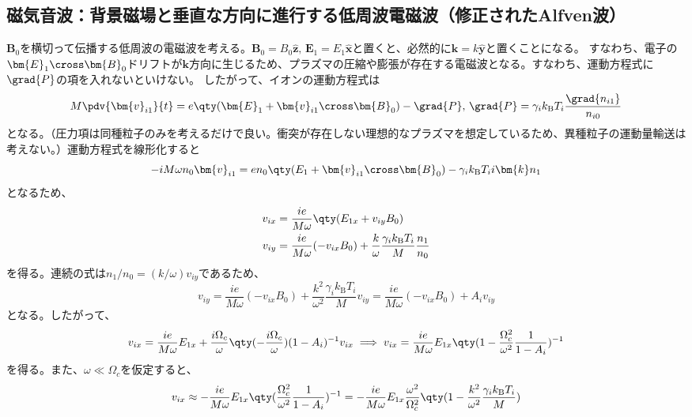 \subsection{磁気音波：背景磁場と垂直な方向に進行する低周波電磁波（修正されたAlfven波）}
$\bm{B}_0$を横切って伝播する低周波の電磁波を考える。$\bm{B}_0 = B_0\hat{\bm{z}},\,\bm{E}_1 = E_1\hat{\bm{x}}$と置くと、必然的に$\bm{k} = k\hat{\bm{y}}$と置くことになる。
すなわち、電子の$\bm{E}_1\cross\bm{B}_0$ドリフトが$\bm{k}$方向に生じるため、プラズマの圧縮や膨張が存在する電磁波となる。すなわち、運動方程式に$\grad{P}$の項を入れないといけない。
したがって、イオンの運動方程式は
\begin{equation}
	M\pdv{\bm{v}_{i1}}{t} = e\qty(\bm{E}_1 + \bm{v}_{i1}\cross\bm{B}_0) - \grad{P},\,
	\grad{P} = \gamma_ik_{\text{B}}T_i\frac{\grad{n_{i1}}}{n_{i0}}
\end{equation}
となる。（圧力項は同種粒子のみを考えるだけで良い。衝突が存在しない理想的なプラズマを想定しているため、異種粒子の運動量輸送は考えない。）運動方程式を線形化すると
\begin{equation}
	-iM\omega{}n_0\bm{v}_{i1} = en_0\qty(E_{1}+\bm{v}_{i1}\cross\bm{B}_0)-\gamma_i{}k_{\text{B}}T_ii\bm{k}n_{1}
\end{equation}
となるため、
\begin{align}
	v_{ix} & = \frac{ie}{M\omega}\qty(E_{1x} + v_{iy}B_0)                                                        \\
	v_{iy} & = \frac{ie}{M\omega}(-v_{ix}B_0) + \frac{k}{\omega}\frac{\gamma_ik_{\text{B}}T_i}{M}\frac{n_1}{n_0}
\end{align}
を得る。連続の式は$n_1/n_0 = (k/\omega)v_{iy}$であるため、
\begin{equation}
	v_{iy} = \frac{ie}{M\omega}(-v_{ix}B_0) + \frac{k^2}{\omega^2}\frac{\gamma_ik_{\text{B}}T_i}{M}v_{iy} = \frac{ie}{M\omega}(-v_{ix}B_0) + A_iv_{iy}
\end{equation}
となる。したがって、
\begin{equation}
	v_{ix} = \frac{ie}{M\omega}E_{1x} + \frac{i\Omega_c}{\omega}\qty(-\frac{i\Omega_c}{\omega})(1-A_i)^{-1}v_{ix} \implies v_{ix}
	= \frac{ie}{M\omega}E_{1x}\qty(1-\frac{\Omega^2_c}{\omega^2}\frac{1}{1-A_i})^{-1}
\end{equation}
を得る。また、$\omega \ll \Omega_c$を仮定すると、
\begin{equation}
	v_{ix} \approx -\frac{ie}{M\omega}E_{1x}\qty(\frac{\Omega^2_c}{\omega^2}\frac{1}{1-A_i})^{-1}
	= -\frac{ie}{M\omega}E_{1x}\frac{\omega^2}{\Omega_c^2}\qty(1-\frac{k^2}{\omega^2}\frac{\gamma_ik_{\text{B}}T_i}{M})
\end{equation}
